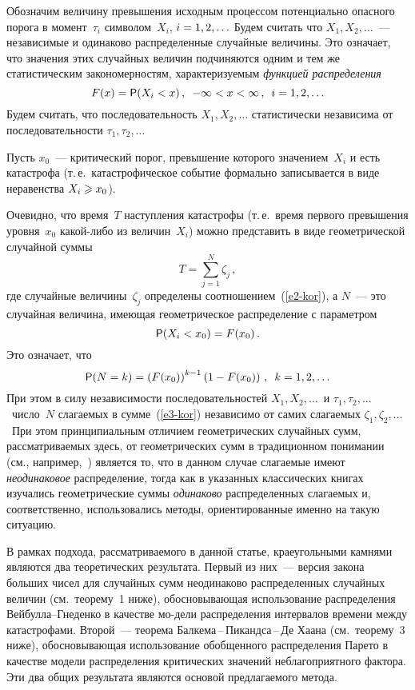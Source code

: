 \begin{multicols}{2}
Обозначим величину превышения исходным процессом потенциально
опасного порога в момент~$\tau_i$ символом~$X_i$, $i\hm=1,2,\ldots$
Будем считать что $X_1,X_2,\ldots$~--- независимые и одинаково
распределенные случайные величины. Это означает, что значения этих
случайных величин подчиняются одним и тем же статистическим
закономерностям, характеризуемым \textit{функцией распределения}
$$
F(x)={\sf P}(X_i<x)\,,\enskip -\infty<x<\infty\,,\enskip i=1,2,\ldots
$$
Будем считать, что последовательность $X_1,X_2,\ldots$ статистически
независима от последовательности $\tau_1,\tau_2,\ldots$

Пусть $x_0$~--- критический порог, превышение которого значением~$X_i$ и есть 
катастрофа (т.\,е.\ катастрофическое событие формально записывается в виде 
неравенства $X_i\hm\geqslant x_0$).

Очевидно, что время~$T$ наступления катастрофы (т.\,е.\ время
первого превышения уровня~$x_0$ ка\-кой-ли\-бо из величин~$X_i$) можно
представить в виде геометрической случайной суммы
\begin{equation}
T=\sum\limits_{j=1}^{N}\zeta_j\,,\label{e3-kor}
\end{equation} 
где случайные величины~$\zeta_j$ определены соотношением~(\ref{e2-kor}), а $N$~--- это случайная
величина, имеющая геометрическое распределение с параметром 
$$
{\sf P}(X_i<x_0)=F(x_0)\,.
$$ 
Это означает, что
$$
{\sf P}(N=k)=\left(F(x_0)\right)^{k-1}\left(1-F(x_0)\right)\,,\enskip
k=1,2,\ldots
$$
При этом в силу независимости последовательностей $X_1,X_2,\ldots$\ и
$\tau_1,\tau_2,\ldots$\ число~$N$ слагаемых в сумме~(\ref{e3-kor}) независимо от
самих слагаемых $\zeta_1,\zeta_2,\ldots$\ При этом принципиальным
отличием гео\-мет\-ри\-че\-ских случайных сумм, рассматриваемых здесь, от
гео\-мет\-ри\-че\-ских сумм в традиционном понимании 
(см., например,~\cite{Kalashnikov1997, KorolevBeningShorgin2011}) является то, что в
данном случае слагаемые имеют \textit{неодинаковое} распределение,
тогда как в указанных классических книгах изуча\-лись геометрические
суммы \textit{одинаково} распределенных слагаемых и, соответственно,
использовались методы, ориентированные именно на такую ситуацию.

В рамках подхода, рассматриваемого в данной статье, краеугольными
камнями являются два тео\-ре\-ти\-че\-ских результата. Первый из них~---
версия закона больших чисел для случайных сумм неодинаково
распределенных случайных величин (см.\ теорему~1 ниже), обосновывающая
использование распределения Вей\-бул\-ла--Гне\-ден\-ко в качестве мо-\linebreak дели
распределения интервалов времени между катастрофа\-ми. Второй~---
теорема Бал\-ке\-ма\,--\,Пи\-канд\-са\,--\,Де Ха\-ана (см.\ теорему~3 ниже), обосновывающая
использование обобщенного распределения Парето в качестве модели
распределения критиче\-ских значений неблагоприятного фактора. Эти два
общих результата являются основой предлагаемого метода.


\end{multicols}
